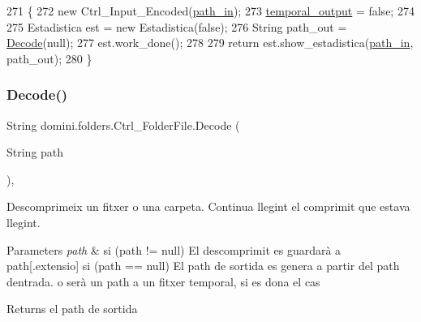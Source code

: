 \begin{DoxyCode}
271                            \{
272         \textcolor{keyword}{new} Ctrl\_Input\_Encoded(\hyperlink{classdomini_1_1folders_1_1Ctrl__FolderFile_a0d3946bb2832a1f34d0c2227df5c71c4}{path\_in});
273         \hyperlink{classdomini_1_1folders_1_1Ctrl__FolderFile_a0db81590abe27b21a9b8c37633c86fa6}{temporal\_output} = \textcolor{keyword}{false};
274 
275         Estadistica est = \textcolor{keyword}{new} Estadistica(\textcolor{keyword}{false});
276         String path\_out = \hyperlink{classdomini_1_1folders_1_1Ctrl__FolderFile_a5d28ac7f5223ecd40a242148e86447c1}{Decode}(null);
277         est.work\_done();
278 
279         \textcolor{keywordflow}{return} est.show\_estadistica(\hyperlink{classdomini_1_1folders_1_1Ctrl__FolderFile_a0d3946bb2832a1f34d0c2227df5c71c4}{path\_in}, path\_out);
280     \}
\end{DoxyCode}
\mbox{\label{classdomini_1_1folders_1_1Ctrl__FolderFile_ababd536f11319589ce3c371e3701afc6}} 
\subsubsection{\texorpdfstring{Decode()}{Decode()}\hspace{0.1cm}{\footnotesize\ttfamily [2/2]}}
{\footnotesize\ttfamily String domini.\+folders.\+Ctrl\+\_\+\+Folder\+File.\+Decode (\begin{DoxyParamCaption}\item[{String}]{path }\end{DoxyParamCaption})\hspace{0.3cm}{\ttfamily [inline]}, {\ttfamily [private]}}



Descomprimeix un fitxer o una carpeta. Continua llegint el comprimit que estava llegint. 


\begin{DoxyParams}{Parameters}
{\em path} & si (path != null) El descomprimit es guardarà a path\mbox{[}.extensio\mbox{]} si (path == null) El path de sortida es genera a partir del path d\textquotesingle{}entrada. o serà un path a un fitxer temporal, si es dona el cas \\
\hline
\end{DoxyParams}
\begin{DoxyReturn}{Returns}
el path de sortida 
\end{DoxyReturn}

